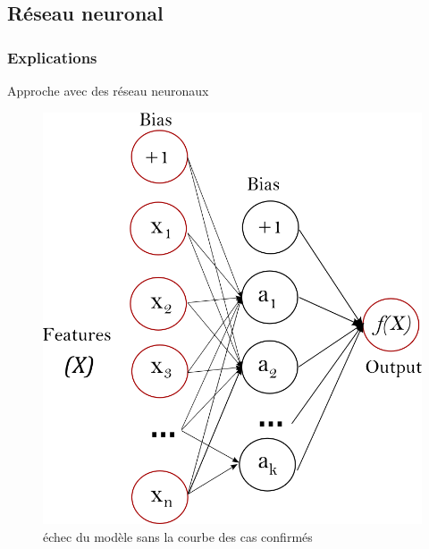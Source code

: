 \documentclass{beamer}
\begin{document}
\subsection{Réseau neuronal}
\begin{frame}
	\frametitle{Explications}
	Approche avec des réseau neuronaux
	\begin{figure}[t]
		\centering
		\begin{minipage}{0.5\textwidth}
			\includegraphics[scale=0.2]{nn_sk}
		\end{minipage}
	\caption{échec du modèle sans la courbe des cas confirmés}
	\end{figure}
\end{frame}
\end{document}
